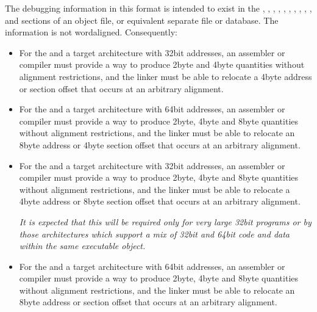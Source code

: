 The debugging information in this format is intended to
exist 
in 
the \dotdebugabbrev{}, 
\dotdebugaranges{}, 
\dotdebugframe{},
\dotdebuginfo{}, 
\dotdebugline{}, 
\dotdebugloc{}, 
\dotdebugmacinfo{},
\dotdebugpubnames{}, 
\dotdebugpubtypes{}, 
\dotdebugranges{}, 
\dotdebugstr{}
and 
\dotdebugtypes{}
sections of an object file, or equivalent
separate file or database. The information is not 
word\dash aligned. Consequently:

\begin{itemize}
\item For the \thirtytwobitdwarfformat{} and a target architecture with
32\dash bit addresses, an assembler or compiler must provide a way
to produce 2\dash byte and 4\dash byte quantities without alignment
restrictions, and the linker must be able to relocate a
4\dash byte address or 
section offset that occurs at an arbitrary
alignment.

\item For the \thirtytwobitdwarfformat{} and a target architecture with
64\dash bit addresses, an assembler or compiler must provide a
way to produce 2\dash byte, 4\dash byte and 8\dash byte quantities without
alignment restrictions, and the linker must be able to relocate
an 8\dash byte address or 4\dash byte 
section offset that occurs at an
arbitrary alignment.

\item For the \sixtyfourbitdwarfformat{} and a target architecture with
32\dash bit addresses, an assembler or compiler must provide a
way to produce 2\dash byte, 4\dash byte and 8\dash byte quantities without
alignment restrictions, and the linker must be able to relocate
a 4\dash byte address or 8\dash byte 
section offset that occurs at an
arbitrary alignment.

\textit{It is expected that this will be required only for very large
32\dash bit programs or by those architectures which support
a mix of 32\dash bit and 64\dash bit code and data within the same
executable object.}

\item For the \sixtyfourbitdwarfformat{} and a target architecture with
64\dash bit addresses, an assembler or compiler must provide a
way to produce 2\dash byte, 4\dash byte and 8\dash byte quantities without
alignment restrictions, and the linker must be able to
relocate an 8\dash byte address or 
section offset that occurs at
an arbitrary alignment.
\end{itemize}

